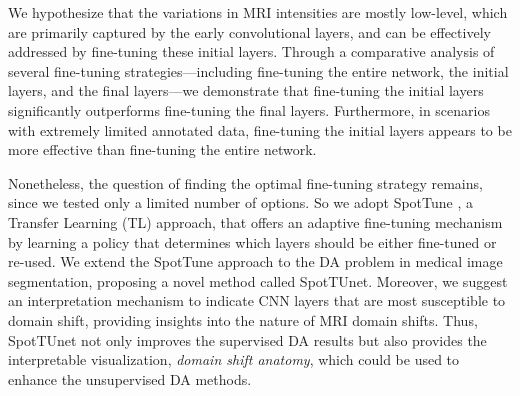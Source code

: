 We hypothesize that the variations in MRI intensities are mostly low-level, which are primarily captured by the early convolutional layers, and can be effectively addressed by fine-tuning these initial layers. Through a comparative analysis of several fine-tuning strategies---including fine-tuning the entire network, the initial layers, and the final layers---we demonstrate that fine-tuning the initial layers significantly outperforms fine-tuning the final layers. Furthermore, in scenarios with extremely limited annotated data, fine-tuning the initial layers appears to be more effective than fine-tuning the entire network.

Nonetheless, the question of finding the optimal fine-tuning strategy remains, since we tested only a limited number of options. So we adopt SpotTune \cite{guo2019spottune}, a Transfer Learning (TL) approach, that offers an adaptive fine-tuning mechanism by learning a policy that determines which layers should be either fine-tuned or re-used. We extend the SpotTune approach to the DA problem in medical image segmentation, proposing a novel method called SpotTUnet. Moreover, we suggest an interpretation mechanism to indicate CNN layers that are most susceptible to domain shift, providing insights into the nature of MRI domain shifts. Thus, SpotTUnet not only improves the supervised DA results but also provides the interpretable visualization, \textit{domain shift anatomy}, which could be used to enhance the unsupervised DA methods.





